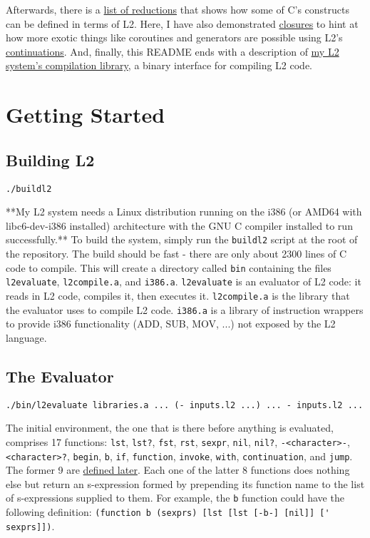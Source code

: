 \documentclass[twocolumn,landscape]{article}
\begin{document}
    Afterwards, there is a \hyperref[sec:examplesreductions]{list of reductions} that shows how some of C's constructs can be defined in terms of L2. Here, I have also demonstrated \hyperref[sec:closures]{closures} to hint at how more exotic things like coroutines and generators are possible using L2's \hyperref[sec:jump]{continuations}. And, finally, this README ends with a description of \hyperref[sec:compilation-library]{my L2 system's compilation library}, a binary interface for compiling L2 code.

  \tableofcontents

  \section{Getting Started}\label{sec:getting-started}
  \subsection{Building L2}\label{sec:building-l2}
  \begin{lstlisting}
./buildl2
  \end{lstlisting}
  **My L2 system needs a Linux distribution running on the i386 (or AMD64 with libc6-dev-i386 installed) architecture with the GNU C compiler installed to run successfully.** To build the system, simply run the \lstinline{buildl2} script at the root of the repository. The build should be fast - there are only about 2300 lines of C code to compile. This will create a directory called \lstinline{bin} containing the files \lstinline{l2evaluate}, \lstinline{l2compile.a}, and \lstinline{i386.a}. \lstinline{l2evaluate} is an evaluator of L2 code: it reads in L2 code, compiles it, then executes it. \lstinline{l2compile.a} is the library that the evaluator uses to compile L2 code. \lstinline{i386.a} is a library of instruction wrappers to provide i386 functionality (ADD, SUB, MOV, ...) not exposed by the L2 language.

  \subsection{The Evaluator}\label{sec:the-evaluator}
    \begin{lstlisting}
./bin/l2evaluate libraries.a ... (- inputs.l2 ...) ... - inputs.l2 ...
    \end{lstlisting}
    The initial environment, the one that is there before anything is evaluated, comprises 17 functions: \lstinline{lst}, \lstinline{lst?}, \lstinline{fst}, \lstinline{rst}, \lstinline{sexpr}, \lstinline{nil}, \lstinline{nil?}, \lstinline{-<character>-}, \lstinline{<character>?}, \lstinline{begin}, \lstinline{b}, \lstinline{if}, \lstinline{function}, \lstinline{invoke}, \lstinline{with}, \lstinline{continuation}, and \lstinline{jump}. The former 9 are \hyperref[sec:internal-representation]{defined later}. Each one of the latter 8 functions does nothing else but return an s-expression formed by prepending its function name to the list of s-expressions supplied to them. For example, the \lstinline{b} function could have the following definition: \lstinline{(function b (sexprs) [lst [lst [-b-] [nil]] [' sexprs]])}.
\end{document}
